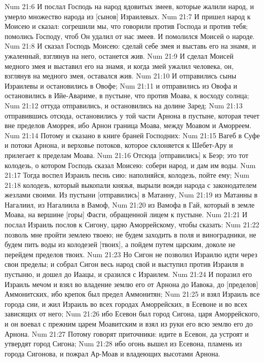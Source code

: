 Num 21:6  И послал Господь на народ ядовитых змеев, которые жалили народ, и умерло множество народа из [сынов] Израилевых.
Num 21:7  И пришел народ к Моисею и сказал: согрешили мы, что говорили против Господа и против тебя; помолись Господу, чтоб Он удалил от нас змеев. И помолился Моисей о народе.
Num 21:8  И сказал Господь Моисею: сделай себе змея и выставь его на знамя, и ужаленный, взглянув на него, останется жив.
Num 21:9  И сделал Моисей медного змея и выставил его на знамя, и когда змей ужалил человека, он, взглянув на медного змея, оставался жив.
Num 21:10  И отправились сыны Израилевы и остановились в Овофе;
Num 21:11  и отправились из Овофа и остановились в Ийе-Авариме, в пустыне, что против Моава, к восходу солнца;
Num 21:12  оттуда отправились, и остановились на долине Заред;
Num 21:13  отправившись отсюда, остановились у той части Арнона в пустыне, которая течет вне пределов Аморрея, ибо Арнон граница Моава, между Моавом и Аморреем.
Num 21:14  Потому и сказано в книге браней Господних:
Num 21:15  Вагеб в Суфе и потоки Арнона, и верховье потоков, которое склоняется к Шебет-Ару и прилегает к пределам Моава.
Num 21:16  Отсюда [отправились] к Беэр; это тот колодезь, о котором Господь сказал Моисею: собери народ, и дам им воды.
Num 21:17  Тогда воспел Израиль песнь сию: наполняйся, колодезь, пойте ему;
Num 21:18  колодезь, который выкопали князья, вырыли вожди народа с законодателем жезлами своими. Из пустыни [отправились] в Матанну,
Num 21:19  из Матанны в Нагалиил, из Нагалиила в Вамоф,
Num 21:20  из Вамофа в Гай, который в земле Моава, на вершине [горы] Фасги, обращенной лицем к пустыне.
Num 21:21  И послал Израиль послов к Сигону, царю Аморрейскому, чтобы сказать:
Num 21:22  позволь мне пройти землею твоею; не будем заходить в поля и виноградники, не будем пить воды из колодезей [твоих], а пойдем путем царским, доколе не перейдем пределов твоих.
Num 21:23  Но Сигон не позволил Израилю идти через свои пределы; и собрал Сигон весь народ свой и выступил против Израиля в пустыню, и дошел до Иаацы, и сразился с Израилем.
Num 21:24  И поразил его Израиль мечом и взял во владение землю его от Арнона до Иавока, до [пределов] Аммонитских, ибо крепок был предел Аммонитян;
Num 21:25  и взял Израиль все города сии, и жил Израиль во всех городах Аморрейских, в Есевоне и во всех зависящих от него;
Num 21:26  ибо Есевон был город Сигона, царя Аморрейского, и он воевал с прежним царем Моавитским и взял из руки его всю землю его до Арнона.
Num 21:27  Потому говорят приточники: идите в Есевон, да устроят и утвердят город Сигона;
Num 21:28  ибо огонь вышел из Есевона, пламень из города Сигонова, и пожрал Ар-Моав и владеющих высотами Арнона.

